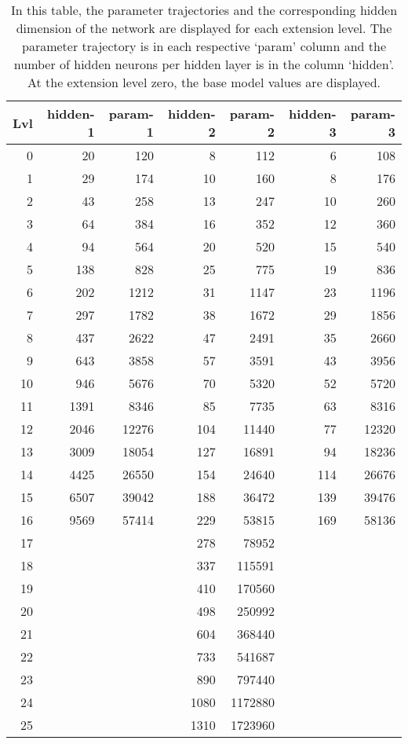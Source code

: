 \begin{table}[t]\scriptsize
    {
    \sffamily
    \caption[Parameter Trajectories of different network sizes]{
    In this table, the parameter trajectories and the corresponding hidden dimension of the network are displayed for each extension level. 
    The parameter trajectory is in each respective `param' column and the number of hidden neurons per hidden layer is in the column `hidden'.
    At the extension level zero, the base model values are displayed.
    }\label{tab:trajectory}
    \begin{tabular}{rrrrrrr}
    \toprule
    Lvl & hidden-1 & param-1 & hidden-2 & param-2 & hidden-3 & param-3 \\
    \midrule
    0 & 20 & 120 & 8 & 112 & 6 & 108 \\
    1 & 29 & 174 & 10 & 160 & 8 & 176 \\
    2 & 43 & 258 & 13 & 247 & 10 & 260 \\
    3 & 64 & 384 & 16 & 352 & 12 & 360 \\
    4 & 94 & 564 & 20 & 520 & 15 & 540 \\
    5 & 138 & 828 & 25 & 775 & 19 & 836 \\
    6 & 202 & 1212 & 31 & 1147 & 23 & 1196 \\
    7 & 297 & 1782 & 38 & 1672 & 29 & 1856 \\
    8 & 437 & 2622 & 47 & 2491 & 35 & 2660 \\
    9 & 643 & 3858 & 57 & 3591 & 43 & 3956 \\
    10 & 946 & 5676 & 70 & 5320 & 52 & 5720 \\
    11 & 1391 & 8346 & 85 & 7735 & 63 & 8316 \\
    12 & 2046 & 12276 & 104 & 11440 & 77 & 12320 \\
    13 & 3009 & 18054 & 127 & 16891 & 94 & 18236 \\
    14 & 4425 & 26550 & 154 & 24640 & 114 & 26676 \\
    15 & 6507 & 39042 & 188 & 36472 & 139 & 39476 \\
    16 & 9569 & 57414 & 229 & 53815 & 169 & 58136 \\
    17 &   &   & 278 & 78952 &   &   \\
    18 &   &   & 337 & 115591 &   &   \\
    19 &   &   & 410 & 170560 &   &   \\
    20 &   &   & 498 & 250992 &   &   \\
    21 &   &   & 604 & 368440 &   &   \\
    22 &   &   & 733 & 541687 &   &   \\
    23 &   &   & 890 & 797440 &   &   \\
    24 &   &   & 1080 & 1172880 &   &   \\
    25 &   &   & 1310 & 1723960 &   &   \\
    \bottomrule
    \end{tabular}
    }
\end{table}

